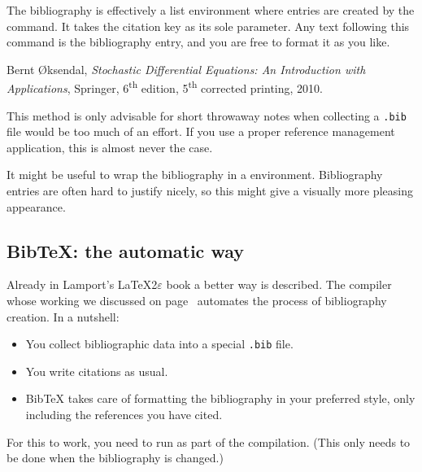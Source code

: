 The bibliography is effectively a list environment
where entries are created by the  command.
It takes the citation key as its sole parameter.
Any text following this command is the bibliography entry,
and you are free to format it as you like.

\begin{ExampleCode}
\begin{thebibliography}{9}

    Bernt \O{}ksendal,
    \textit{Stochastic Differential Equations:
    An Introduction with Applications},
    Springer,
    6\textsuperscript{th} edition, 5\textsuperscript{th} corrected printing,
    2010.

\end{thebibliography}
\end{ExampleCode}

\begin{practices}
This method is only advisable for short throwaway notes
when collecting a \verb|.bib| file would be too much of an effort.
If you use a proper reference management application,
this is almost never the case.
\end{practices}

\begin{technote}
It might be useful to wrap the bibliography in a  environment.
Bibliography entries are often hard to justify nicely,
so this might give a visually more pleasing appearance.
\end{technote}



%
\subsection{BibTeX: the automatic way}

Already in Lamport's \LaTeX2$\varepsilon$ book \cite{lamport} a better way is described.
The  compiler whose working we discussed on page~\pageref{bibtex process}
automates the process of bibliography creation.
In a nutshell:
\begin{itemize}
\item You collect bibliographic data into a special \verb|.bib| file.
\item You write citations as usual.
\item BibTeX takes care of formatting the bibliography in your preferred style,
    only including the references you have cited.
\end{itemize}
%
For this to work, you need to run  as part of the compilation.
(This only needs to be done when the bibliography is changed.)

